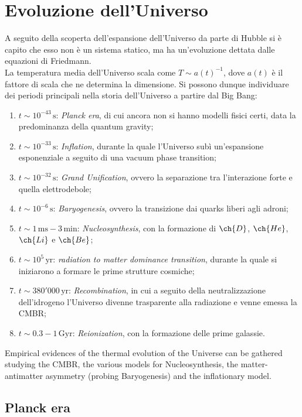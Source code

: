 \section{Evoluzione dell'Universo}

A seguito della scoperta dell'espansione dell'Universo da parte di Hubble si è capito che esso non è un sistema statico, ma ha un'evoluzione dettata dalle equazioni di Friedmann.\\
La temperatura media dell'Universo scala come $ T \sim a(t)^{-1} $, dove $ a(t) $ è il fattore di scala che ne determina la dimensione. Si possono dunque individuare dei periodi principali nella storia dell'Universo a partire dal Big Bang:
\begin{enumerate}
	\item $ t \sim 10^{-43} \,\text{s} $: \textit{Planck era}, di cui ancora non si hanno modelli fisici certi, data la predominanza della quantum gravity;
	\item $ t \sim 10^{-33} \,\text{s} $: \textit{Inflation}, durante la quale l'Universo subì un'espansione esponenziale a seguito di una vacuum phase transition;
	\item $ t \sim 10^{-32} \,\text{s} $: \textit{Grand Unification}, ovvero la separazione tra l'interazione forte e quella elettrodebole;
	\item $ t \sim 10^{-6} \,\text{s} $: \textit{Baryogenesis}, ovvero la transizione dai quarks liberi agli adroni;
	\item $ t \sim 1\,\text{ms} - 3\,\text{min} $: \textit{Nucleosynthesis}, con la formazione di $ \ch{D} $, $ \ch{He} $, $ \ch{Li} $ e $ \ch{Be} $;
	\item $ t \sim 10^5 \,\text{yr} $: \textit{radiation to matter dominance transition}, durante la quale si iniziarono a formare le prime strutture cosmiche;
	\item $ t \sim 380'000 \,\text{yr} $: \textit{Recombination}, in cui a seguito della neutralizzazione dell'idrogeno l'Universo divenne trasparente alla radiazione e venne emessa la CMBR;
	\item $ t \sim 0.3 - 1 \,\text{Gyr} $: \textit{Reionization}, con la formazione delle prime galassie.
\end{enumerate}
Empirical evidences of the thermal evolution of the Universe can be gathered studying the CMBR, the various models for Nucleosynthesis, the matter-antimatter asymmetry (probing Baryogenesis) and the inflationary model.

\subsection{Planck era}

